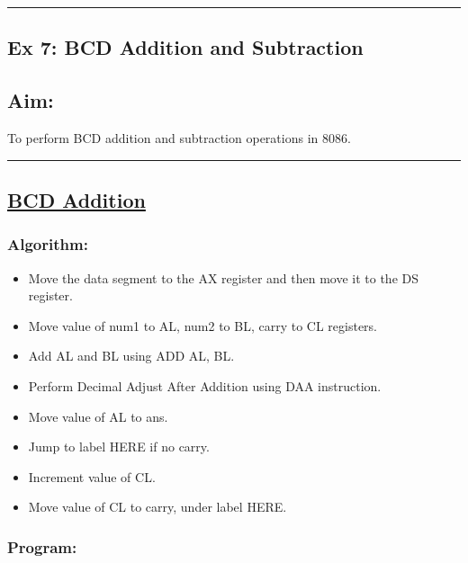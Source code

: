 \documentclass[10pt,a4paper]{article}
\begin{document}
\hrule
\newpage
\begin{flushleft}
\section*{\textbf{Ex 7: BCD Addition and Subtraction}}
\subsection*{\textbf{Aim:}} 
To perform BCD addition and subtraction operations in 8086.

\vspace{1cm}
\hrule
\subsection*{\textbf{\underline{BCD Addition}}}

\subsubsection*{\textbf{Algorithm:}}
\begin{itemize}
    \item Move the data segment to the AX register and then move it to the DS register.
    \item Move value of num1 to AL, num2 to BL, carry to CL registers.
    \item Add AL and BL using ADD AL, BL.
    \item Perform Decimal Adjust After Addition using DAA instruction.
    \item Move value of AL to ans.
    \item Jump to label HERE if no carry.
    \item Increment value of CL.
    \item Move value of CL to carry, under label HERE.
\end{itemize}

\newpage
\subsubsection*{\textbf{Program:}}


\end{flushleft}
\end{document}
